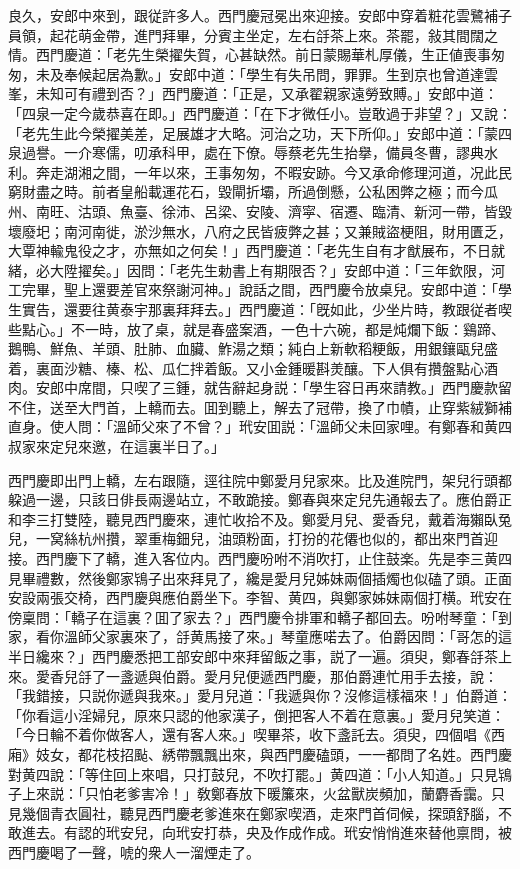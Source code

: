 良久，安郎中來到，跟従許多人。西門慶冠冕出來迎接。安郎中穿着粧花雲鷺補子員領，起花萌金帶，進門拜畢，分賓主坐定，左右㧱茶上來。茶罷，敍其間闊之情。西門慶道：「老先生榮擢失賀，心甚缺然。前日蒙賜華札厚儀，生正値喪事匆匆，未及奉候起居為歉。」安郎中道：「學生有失吊問，罪罪。生到京也曾道達雲峯，未知可有禮到否？」西門慶道：「正是，又承翟親家遠勞致賻。」安郎中道：「四泉一定今歲恭喜在即。」西門慶道：「在下才微任小。豈敢過于非望？」又說：「老先生此今榮擢美差，足展雄才大略。河治之功，天下所仰。」安郎中道：「蒙四泉過譽。一介寒儒，叨承科甲，處在下僚。辱蔡老先生抬擧，備員冬曹，謬典水利。奔走湖湘之間，一年以來，王事匆匆，不暇安跡。今又承命修理河道，况此民窮財盡之時。前者皇船載運花石，毀閘折壩，所過倒懸，公私困弊之極；而今瓜州、南旺、沽頭、魚臺、徐沛、呂梁、安陵、濟寜、宿遷、臨清、新河一帶，皆毀壞廢圯；南河南徙，淤沙無水，八府之民皆疲弊之甚；又兼賊盜梗阻，財用匱乏，大覃神輸鬼役之才，亦無如之何矣！」西門慶道：「老先生自有才猷展布，不日就緒，必大陞擢矣。」因問：「老先生勅書上有期限否？」安郎中道：「三年欽限，河工完畢，聖上還要差官來祭謝河神。」說話之間，西門慶令放桌兒。安郎中道：「學生實告，還要往黄泰宇那裏拜拜去。」西門慶道：「旣如此，少坐片時，教跟従者喫些點心。」不一時，放了桌，就是春盛案酒，一色十六碗，都是炖爛下飯：鷄蹄、鵝鴨、鮮魚、羊頭、肚肺、血臟、鮓湯之類；純白上新軟稻粳飯，用銀鑲甌兒盛着，裏面沙糖、榛、松、瓜仁拌着飯。又小金鍾暖斟羙釀。下人俱有攢盤點心酒肉。安郎中席間，只喫了三鍾，就告辭起身説：「學生容日再來請教。」西門慶款留不住，送至大門首，上轎而去。囬到聽上，解去了冠帶，換了巾幘，止穿紫絨獅補直身。使人問：「溫師父來了不曾？」玳安囬説：「溫師父未回家哩。有鄭春和黄四叔家來定兒來邀，在這裏半日了。」

西門慶即出門上轎，左右跟隨，逕往院中鄭愛月兒家來。比及進院門，架兒行頭都躱過一邊，只該日俳長兩邊站立，不敢跪接。鄭春與來定兒先通報去了。應伯爵正和李三打雙陸，聽見西門慶來，連忙收拾不及。鄭愛月兒、愛香兒，戴着海獺臥兔兒，一窝絲杭州攢，翠重梅鈿兒，油頭粉面，打扮的花僊也似的，都出來門首迎接。西門慶下了轎，進入客位内。西門慶吩咐不消吹打，止住鼓楽。先是李三黄四見畢禮數，然後鄭家鴇子出來拜見了，纔是愛月兒姊妹兩個插燭也似磕了頭。正面安設兩張交椅，西門慶與應伯爵坐下。李智、黄四，與鄭家姊妹兩個打横。玳安在傍稟問：「轎子在這裏？囬了家去？」西門慶令排軍和轎子都回去。吩咐琴童：「到家，看你溫師父家裏來了，㧱黄馬接了來。」琴童應喏去了。伯爵因問：「哥怎的這半日纔來？」西門慶悉把工部安郎中來拜留飯之事，説了一遍。須臾，鄭春㧱茶上來。愛香兒㧱了一盞遞與伯爵。愛月兒便遞西門慶，那伯爵連忙用手去接，說：「我錯接，只説你遞與我來。」愛月兒道：「我遞與你？沒修這樣福來！」伯爵道：「你看這小淫婦兒，原來只認的他家漢子，倒把客人不着在意裏。」愛月兒笑道：「今日輪不着你做客人，還有客人來。」喫畢茶，收下盞託去。須臾，四個唱《西廂》妓女，都花枝招颭、綉帶飄飄出來，與西門慶磕頭，一一都問了名姓。西門慶對黄四說：「等住回上來唱，只打鼓兒，不吹打罷。」黄四道：「小人知道。」只見鴇子上來説：「只怕老爹害冷！」敎鄭春放下暖簾來，火盆獸炭頻加，蘭麝香靄。只見幾個青衣圓社，聽見西門慶老爹進來在鄭家喫酒，走來門首伺候，探頭舒腦，不敢進去。有認的玳安兒，向玳安打恭，央及作成作成。玳安悄悄進來替他禀問，被西門慶喝了一聲，唬的衆人一溜煙走了。

